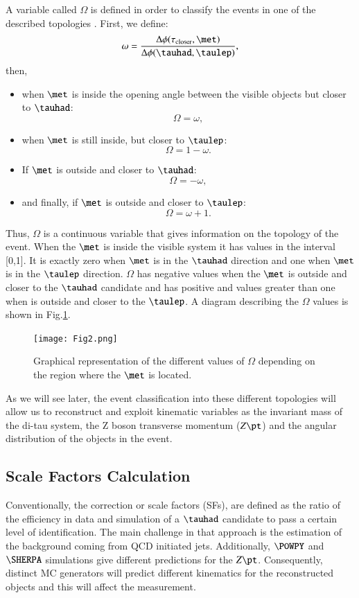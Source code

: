 A variable called $\Omega$ is defined in order to classify the events in one of the described topologies . First, we define:
\begin{equation}
\omega=\frac{\Delta\phi(\tau_{\text{closer}},\met)}{\Delta\phi(\tauhad,\taulep)},
\end{equation}
then,
\begin{itemize}
	\item when $\met$ is inside the opening angle between the visible objects but closer to $\tauhad$:
	\begin{equation}
	\Omega=\omega,
	\end{equation}
	\item when $\met$ is still inside, but closer to $\taulep$:
	\begin{equation}
	\Omega=1-\omega.
	\end{equation}
	\item If $\met$ is outside and closer to $\tauhad$:
	\begin{equation}
	\Omega=-\omega,
	\end{equation}
	\item and finally, if $\met$ is outside and closer to $\taulep$:
	\begin{equation}
	\Omega=\omega+1.
	\end{equation}
\end{itemize}
Thus, $\Omega$ is a continuous variable that gives information on the topology of the event. When the $\met$ is inside the visible system it has values in the interval [0,1]. It is exactly zero when $\met$ is in the $\tauhad$ direction and one when $\met$ is in the $\taulep$ direction. $\Omega$ has negative values when the $\met$ is outside and closer to the $\tauhad$ candidate and has positive and values greater than one when is outside and closer to the $\taulep$. A diagram describing the $\Omega$ values is shown in Fig.\ref{Fig2}.
\begin{figure}[htbp]
	\centering
	\texttt{[image: Fig2.png]}
	\caption{Graphical representation of the different values of $\Omega$ depending on the region where the $\met$ is located.}
	\label{Fig2}
\end{figure}
As we will see later, the event classification into these different topologies will allow us to reconstruct and exploit kinematic variables as the invariant mass of the di-tau system, the Z boson transverse momentum ($Z\pt$) and the angular distribution of the objects in the event.

\subsection{Scale Factors Calculation}\label{sec3.2}
Conventionally, the correction or scale factors (SFs), are defined as the ratio of the efficiency in data and simulation of a $\tauhad$ candidate to pass a certain level of identification. The main challenge in that approach is the estimation of the background coming from QCD initiated jets. Additionally, $\POWPY$ and $\SHERPA$ simulations give different predictions for the $Z\pt$. Consequently, distinct MC generators will predict different kinematics for the reconstructed objects and this will affect the measurement.

